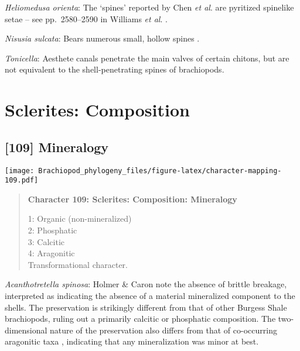 \documentclass[openany]{book}
\theoremstyle{definition}
\theoremstyle{definition}
\theoremstyle{definition}
\theoremstyle{remark}
\begin{document}
\hypertarget{Heliomedusa_orienta-coding-108}{}
\emph{Heliomedusa orienta}: The `spines' reported by Chen \emph{et al}.
\citeyearpar{Chen2007Reinterpretationof} are pyritized spinelike\\
setae -- see pp.~2580--2590 in Williams \emph{et al}.
\citeyearpar{Williams2007Supplement}.

\hypertarget{Nisusia_sulcata-coding-108}{}
\emph{Nisusia sulcata}: Bears numerous small, hollow spines
\citep{Williams2000LinguliformeaCraniiformea}.

\hypertarget{Tonicella-coding-108}{}
\emph{Tonicella}: Aesthete canals penetrate the main valves of certain
chitons, but are not equivalent to the shell-penetrating spines of
brachiopods.

\section{Sclerites: Composition}\label{sclerites-composition}

\subsection*{{[}109{]} Mineralogy}\label{mineralogy}

\texttt{[image: Brachiopod\_phylogeny\_files/figure-latex/character-mapping-109.pdf]}

\begin{quote}
\textbf{Character 109: Sclerites: Composition: Mineralogy}

1: Organic (non-mineralized)\\
2: Phosphatic\\
3: Calcitic\\
4: Aragonitic\\
Transformational character.
\end{quote}

\hypertarget{Acanthotretella_spinosa-coding-109}{}
\emph{Acanthotretella spinosa}: Holmer \& Caron
\citeyearpar{Holmer2006Aspinose} note the absence of brittle breakage,
interpreted as indicating the absence of a material mineralized
component to the shells. The preservation is strikingly different from
that of other Burgess Shale brachiopods, ruling out a primarily calcitic
or phosphatic composition. The two-dimensional nature of the
preservation also differs from that of co-occurring aragonitic taxa
\citep[hyoliths;][ p.~273]{Holmer2006Aspinose}, indicating that any
mineralization was minor at best.
\end{document}
